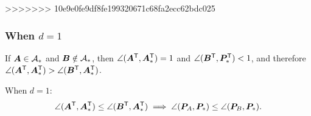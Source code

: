 \documentclass[10pt]{article}
\begin{document}
>>>>>>> 10e9e0fe9df8fe199320671c68fa2ecc62bdc025








\subsubsection{When $d=1$}

\begin{remark}
If $\bA \in \mc{A}_*$ and $\bB \notin \mc{A}_*$, then $\angle(\bA\T,\bA_*\T)=1$ and $\angle(\bB\T,\bP_*\T)<1$, and therefore $\angle(\bA\T,\bA_*\T) > \angle(\bB\T,\bA_*\T)$.
\end{remark}



\begin{lem} \label{q:angle}
When $d=1$:
\label{q:a1}
$$\angle(\bA\T,\bA_*\T) \leq \angle(\bB\T,\bA_*\T) \implies \angle(\bP_A,\bP_*) \leq \angle(\bP_B,\bP_*).$$
\end{lem}
\end{document}
